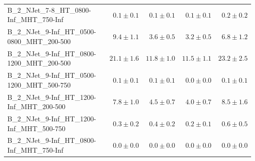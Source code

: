 \documentclass{beamer}
\begin{document}
\begin{frame}
\begin{tabular}{lrrrr}
      B\_2\_NJet\_7-8\_HT\_0800-Inf\_MHT\_750-Inf &               $0.1\pm0.1$&               $0.1\pm0.1$&               $0.1\pm0.1$&                   $0.2\pm0.2$ \\
   B\_2\_NJet\_9-Inf\_HT\_0500-0800\_MHT\_200-500 &               $9.4\pm1.1$&               $3.6\pm0.5$&               $3.2\pm0.5$&                   $6.8\pm1.2$ \\
   B\_2\_NJet\_9-Inf\_HT\_0800-1200\_MHT\_200-500 &              $21.1\pm1.6$&              $11.8\pm1.0$&              $11.5\pm1.1$&                  $23.2\pm2.5$ \\
   B\_2\_NJet\_9-Inf\_HT\_0500-1200\_MHT\_500-750 &               $0.1\pm0.1$&               $0.1\pm0.1$&               $0.0\pm0.0$&                   $0.1\pm0.1$ \\
    B\_2\_NJet\_9-Inf\_HT\_1200-Inf\_MHT\_200-500 &               $7.8\pm1.0$&               $4.5\pm0.7$&               $4.0\pm0.7$&                   $8.5\pm1.6$ \\
    B\_2\_NJet\_9-Inf\_HT\_1200-Inf\_MHT\_500-750 &               $0.3\pm0.2$&               $0.4\pm0.2$&               $0.2\pm0.1$&                   $0.6\pm0.5$ \\
    B\_2\_NJet\_9-Inf\_HT\_0800-Inf\_MHT\_750-Inf &               $0.0\pm0.0$&               $0.0\pm0.0$&               $0.0\pm0.0$&                   $0.0\pm0.0$ \\


\bottomrule
\end{tabular}
\end{frame}
\end{document}
